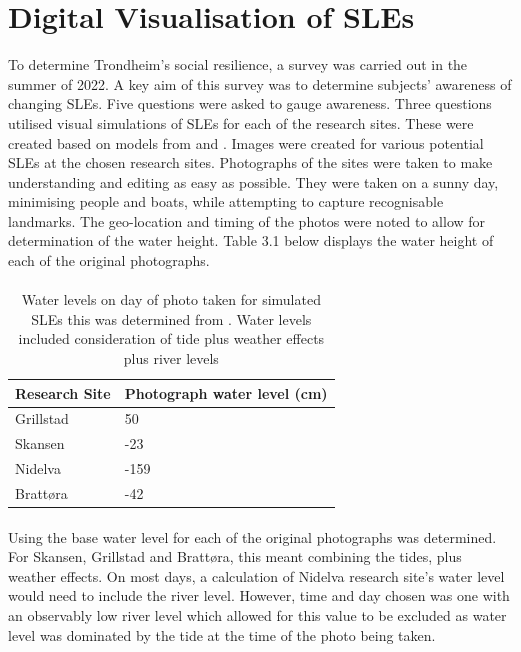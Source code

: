 \section{Digital Visualisation of SLEs}
To determine Trondheim's social resilience, a survey was carried out in the summer of 2022. A key aim of this survey was to determine subjects' awareness of changing SLEs.  Five questions were asked to gauge awareness. Three questions utilised visual simulations of SLEs for each of the research sites. These were created based on models from \cite{dsb_integrating-sea-level-rise-and-storm-surges--local-planningpdf_2017} and \cite{kartverket_se_2020}. Images were created for various potential SLEs at the chosen research sites. Photographs of the sites were taken to make understanding and editing as easy as possible. They were taken on a sunny day, minimising people and boats, while attempting to capture recognisable landmarks. The geo-location and timing of the photos were noted to allow for determination of the water height. Table 3.1 below displays the water height of each of the original photographs. 
\paragraph{}

\begin{table}[h!]
    \centering
    \begin{tabular}{|l|l|}
        \hline
     	\textbf{Research Site} & \textbf{Photograph water level (cm)} \\ \hline
            Grillstad & 50 \\ \hline
            Skansen & -23 \\ \hline
            Nidelva & -159 \\ \hline
            Brattøra	& -42 \\ \hline
    \end{tabular}
    \caption{Water levels on day of photo taken for simulated SLEs this was determined from \cite{tides_high_2022}. Water levels included consideration of tide plus weather effects plus river levels}
    \label{tab:water_level_photo}
\end{table}
\paragraph{}

Using \cite{tides_high_2022} the base water level for each of the original photographs was determined. For Skansen, Grillstad and Brattøra, this meant combining the tides, plus weather effects. On most days, a calculation of Nidelva research site's water level would need to include the river level. However, time and day chosen was one with an observably low river level which allowed for this value to be excluded as water level was dominated by the tide at the time of the photo being taken.   
